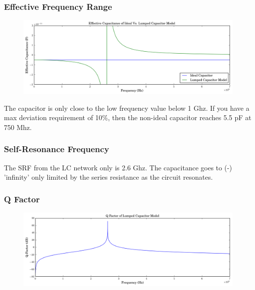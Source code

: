 \documentclass[11pt]{article}
\begin{document}
\subsubsection{Effective Frequency Range}
\begin{figure}[H]
	\centering \includegraphics[width=\textwidth]{images/cap_capacitance.png}
\end{figure}

The capacitor is only close to the low frequency value below 1 Ghz. If you have a max deviation requirement of 10\%, then the non-ideal capacitor reaches 5.5 pF at 750 Mhz.

\subsubsection{Self-Resonance Frequency}
The SRF from the LC network only is 2.6 Ghz. The capacitance goes to (-) 'infinity' only limited by the series resistance as the circuit resonates.

\subsubsection{Q Factor}
\begin{figure}[H]
	\centering \includegraphics[width=\textwidth]{images/capacitor_q.png}
\end{figure}
\end{document}
